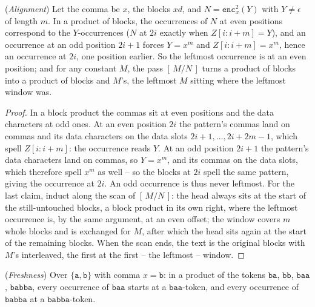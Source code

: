 \documentclass[runningheads,envcountsect]{llncs}
\begin{document}
\begin{lemma}
    (\emph{Alignment})
    \label{lem:align}
    Let the comma be $x$, the blocks $xd$, and $N = \mathtt{enc}^2_{x}(Y)$ with $Y \neq \epsilon$ of length $m$. In a product of blocks, the occurrences of $N$ at even positions correspond to the $Y$-occurrences ($N$ at $2i$ exactly when $Z[i{:}i{+}m] = Y$), and an occurrence at an odd position $2i{+}1$ forces $Y = x^{m}$ and $Z[i{:}i{+}m] = x^{m}$, hence an occurrence at $2i$, one position earlier. So the leftmost occurrence is at an even position; and for any constant $M$, the pass $[\,M/N\,]$ turns a product of blocks into a product of blocks and $M$'s, the leftmost $M$ sitting where the leftmost window was.
\end{lemma}

\begin{proof}
    In a block product the commas sit at even positions and the data characters at odd ones. At an even position $2i$ the pattern's commas land on commas and its data characters on the data slots $2i{+}1, \dots, 2i{+}2m{-}1$, which spell $Z[i{:}i{+}m]$: the occurrence reads $Y$. At an odd position $2i{+}1$ the pattern's data characters land on commas, so $Y = x^{m}$, and its commas on the data slots, which therefore spell $x^{m}$ as well -- so the blocks at $2i$ spell the same pattern, giving the occurrence at $2i$. An odd occurrence is thus never leftmost. For the last claim, induct along the scan of $[\,M/N\,]$: the head always sits at the start of the still-untouched blocks, a block product in its own right, where the leftmost occurrence is, by the same argument, at an even offset; the window covers $m$ whole blocks and is exchanged for $M$, after which the head sits again at the start of the remaining blocks. When the scan ends, the text is the original blocks with $M$'s interleaved, the first at the first -- the leftmost -- window.
\end{proof}

\begin{lemma}
    (\emph{Freshness})
    \label{lem:fresh}
    Over $\{\mathtt{a},\mathtt{b}\}$ with comma $x = \mathtt{b}$: in a product of the tokens $\mathtt{ba}$, $\mathtt{bb}$, $\mathtt{baa}$, $\mathtt{babba}$, every occurrence of $\mathtt{baa}$ starts at a $\mathtt{baa}$-token, and every occurrence of $\mathtt{babba}$ at a $\mathtt{babba}$-token.
\end{lemma}
\end{document}
